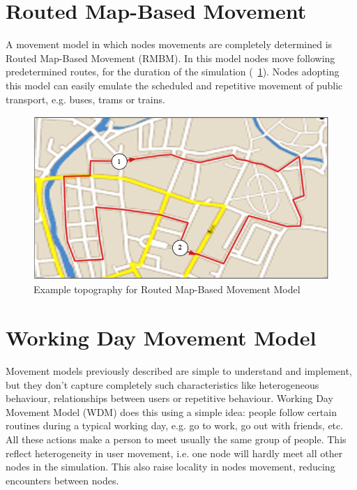 \section{Routed Map-Based Movement}
A movement model in which nodes movements are completely determined is Routed Map-Based Movement (RMBM). In this model nodes move following predetermined routes, for the duration of the simulation (\figurename~\ref{fig:route_map}). Nodes adopting this model can easily emulate the scheduled and repetitive movement of public transport, e.g. buses, trams or trains.
\begin{figure}[!htpb]
  \begin{center}
    \includegraphics[scale=0.6]{4-movimento/img/route_map.png}
    \caption{Example topography for Routed Map-Based Movement Model}    
    \label{fig:route_map}
  \end{center}
\end{figure}

\section{Working Day Movement Model}
\label{descrWDM}
Movement models previously described are simple to understand and implement, but they don't capture completely such characteristics like heterogeneous behaviour, relationships between users or repetitive behaviour. Working Day Movement Model (WDM) \cite{articoloWdm} does this using a simple idea: people follow certain routines during a typical working day, e.g. go to work, go out with friends, etc. All these actions make a person to meet usually the same group of people. This reflect heterogeneity in user movement, i.e. one node will hardly meet all other nodes in the simulation. This also raise locality in nodes movement, reducing encounters between nodes.
\\

